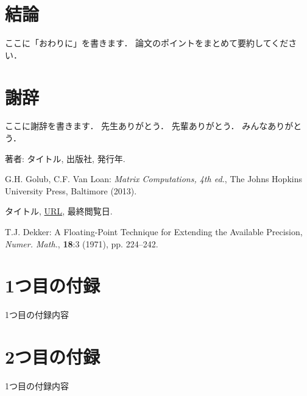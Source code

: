 \documentclass[12pt,a4j,dvipdfmx,titlepage]{jsarticle}%
\numberwithin{NUMBER}{section}
\begin{document}
\section*{結論}

ここに「おわりに」を書きます．
論文のポイントをまとめて要約してください．


\newpage
{}
\section*{謝辞}

ここに謝辞を書きます．
先生ありがとう．
先輩ありがとう．
みんなありがとう．


\begin{thebibliography}{99}%
%
%

著者: タイトル, 出版社, 発行年.

G.H. Golub, C.F. Van Loan: 
\textit{Matrix Computations, 4th ed.}, 
The Johns Hopkins University Press, Baltimore (2013).

タイトル, \url{URL}, 最終閲覧日.

T.J. Dekker: 
A Floating-Point Technique for Extending the Available Precision,
\textit{Numer. Math.},
\textbf{18}:3 (1971), pp. 224--242.

%
%
\end{thebibliography}%


\appendix%
\section{1つ目の付録}%
1つ目の付録内容%


\section{2つ目の付録}%
1つ目の付録内容%
\end{document}
